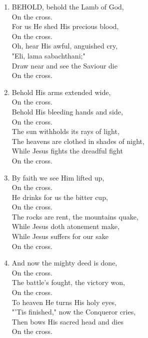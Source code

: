\documentclass[11pt,a4paper]{article}
\begin{document}
\begin{enumerate}
    \item BEHOLD, behold the Lamb of God, \\
            On the cross. \\
        For us He shed His precious blood, \\
            On the cross. \\
        Oh, hear His awful, anguished cry, \\
        "Eli, lama sabachthani;" \\
        Draw near and see the Saviour die \\
            On the cross.

    \item Behold His arms extended wide, \\
            On the cross. \\
        Behold His bleeding hands and side, \\
            On the cross. \\
        The sun withholds its rays of light, \\
        The heavens are clothed in shades of night, \\
        While Jesus fights the dreadful fight \\
            On the cross.

    \item By faith we see Him lifted up, \\
            On the cross. \\
        He drinks for us the bitter cup, \\
            On the cross. \\
        The rocks are rent, the mountains quake, \\
        While Jesus doth atonement make, \\
        While Jesus suffers for our sake \\
            On the cross.

    \item And now the mighty deed is done, \\
            On the cross. \\
        The battle's fought, the victory won, \\
            On the cross. \\
        To heaven He turns His holy eyes, \\
        "'Tis finished," now the Conqueror cries, \\
        Then bows His sacred head and dies \\
            On the cross.


\end{enumerate}
\end{document}
